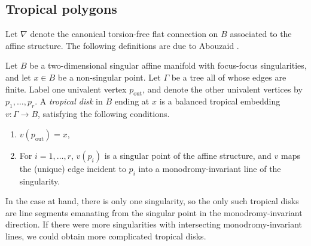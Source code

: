 \documentclass[12pt]{amsart}
\begin{document}
\subsection{Tropical polygons}
\label{sec:tropical-polygons}

Let $\nabla$ denote the canonical torsion-free flat connection on $B$
associated to the affine structure. The following definitions are due to
Abouzaid \cite{abouzaid-msri-dec09}.

\begin{definition}
  \label{def:tropical-disk}
  Let $B$ be a two-dimensional singular affine manifold with focus-focus singularities, and let $x \in B$ be a non-singular point. Let $\Gamma$ be a tree all of whose edges are finite. Label one univalent vertex $p_{\text{out}}$, and denote the other univalent vertices by $p_1,\dots,p_r$. A \emph{tropical disk} in $B$ ending at $x$ is a balanced tropical embedding $v : \Gamma \to B$, satisfying the following conditions.
  \begin{enumerate}
  \item $v(p_{\text{out}}) = x$,
  \item For $i = 1,\dots,r$, $v(p_i)$ is a singular point of the affine structure, and $v$ maps the (unique) edge incident to $p_i$ into a monodromy-invariant line of the singularity.
  \end{enumerate}
\end{definition}

In the case at hand, there is only one singularity, so the only such tropical disks are line segments emanating from the singular point in the monodromy-invariant direction. If there were more singularities with intersecting monodromy-invariant lines, we could obtain more complicated tropical disks.
\end{document}
